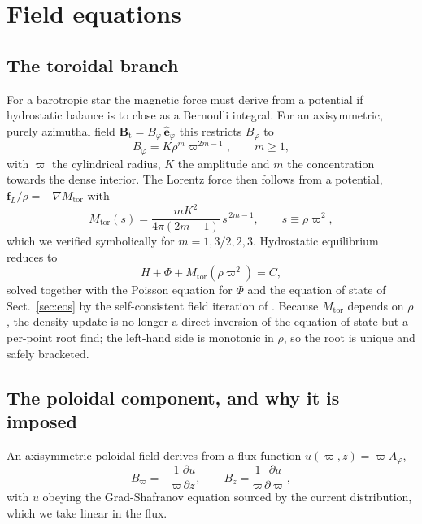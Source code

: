 \documentclass{aa}
\begin{document}

\section{Field equations}
\label{sec:field-eq}

\subsection{The toroidal branch}

For a barotropic star the magnetic force must derive from a potential if
hydrostatic balance is to close as a Bernoulli integral. For an
axisymmetric, purely azimuthal field
$\mathbf{B}_{\mathrm{t}} = B_\varphi\,\hat{\mathbf{e}}_\varphi$ this
restricts $B_\varphi$ to
\begin{equation}
B_\varphi = K \rho^m \varpi^{2m-1}, \qquad m \ge 1,
\label{eq:fieldlaw}
\end{equation}
with $\varpi$ the cylindrical radius, $K$ the amplitude and $m$ the
concentration towards the dense interior. The Lorentz force then follows
from a potential, $\mathbf{f}_L/\rho = -\nabla M_{\mathrm{tor}}$ with
\begin{equation}
M_{\mathrm{tor}}(s) = \frac{m K^2}{4\pi(2m-1)}\, s^{\,2m-1},
\qquad s \equiv \rho\varpi^2 ,
\label{eq:mtor}
\end{equation}
which we verified symbolically for $m = 1, 3/2, 2, 3$. Hydrostatic
equilibrium reduces to
\begin{equation}
H + \Phi + M_{\mathrm{tor}}(\rho\varpi^2) = C ,
\label{eq:bernoulli}
\end{equation}
solved together with the Poisson equation for $\Phi$ and the equation of
state of Sect.~\ref{sec:eos} by the self-consistent field iteration of
\citet{hachisu1986}. Because $M_{\mathrm{tor}}$ depends on $\rho$, the
density update is no longer a direct inversion of the equation of state
but a per-point root find; the left-hand side is monotonic in $\rho$, so
the root is unique and safely bracketed.

\subsection{The poloidal component, and why it is imposed}
\label{sec:poloidal}

An axisymmetric poloidal field derives from a flux function
$u(\varpi,z) = \varpi A_\varphi$,
\begin{equation}
B_\varpi = -\frac{1}{\varpi}\frac{\partial u}{\partial z}, \qquad
B_z = \frac{1}{\varpi}\frac{\partial u}{\partial \varpi},
\label{eq:poloidal}
\end{equation}
with $u$ obeying the Grad-Shafranov equation
\citep{grad1958,shafranov1966} sourced by the current distribution, which
we take linear in the flux.
\end{document}

